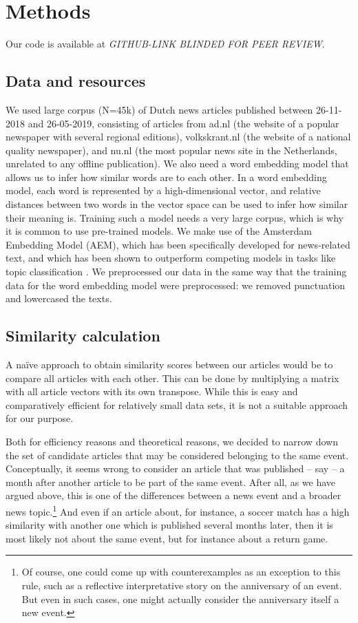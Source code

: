 \documentclass[a4paper,man,natbib,floatsintext,mask]{apa6}
\begin{document}
\section{Methods}
Our code is available at \emph{GITHUB-LINK BLINDED FOR PEER REVIEW}.
\subsection{Data and resources}

We used large corpus (N=45k) of Dutch news articles  published between 26-11-2018 and 26-05-2019,  consisting of articles from ad.nl (the website of a popular newspaper with several regional editions), volkskrant.nl (the website of a national quality newspaper), and nu.nl (the most popular news site in the Netherlands, unrelated to any offline publication).
We also need a word embedding model that allows us to infer how similar words are to each other.
In a word embedding model, each word is represented by a high-dimensional vector, and relative distances between two words in the vector space can be used to infer how similar their meaning is.
Training such a model needs a very large corpus, which is why it is common to use pre-trained models. 
We make use of the Amsterdam Embedding Model (AEM), which has been specifically developed for news-related text, and which has been shown to outperform competing models in tasks like topic classification \citep{AEM}. 
We preprocessed our data in the same way that the training data for the word embedding model were preprocessed: we removed punctuation and lowercased the texts.



\subsection{Similarity calculation}
A na\"ive approach to obtain similarity scores between our articles would be to compare all articles with each other.
This can be done by multiplying a matrix with all article vectors with its own transpose.
While this is easy and comparatively efficient for relatively small data sets, it is not a suitable approach for our purpose.

Both for efficiency reasons and theoretical reasons, we decided to narrow down the set of candidate articles that may be considered belonging to the same event.
Conceptually, it seems wrong to consider an article that was published -- say -- a month after another article to be part of the same event. After all, as we have argued above, this is one of the differences between a news event and a broader news topic.\footnote{Of course, one could come up with counterexamples as an exception to this rule, such as a reflective interpretative story on the anniversary of an event. But even in such cases, one might actually consider the anniversary itself a new event.} 
And even if an article about, for instance, a soccer match has a high similarity with another one which is published several months later, then it is most likely not about the same event, but for instance about a return game.
 
\end{document}
